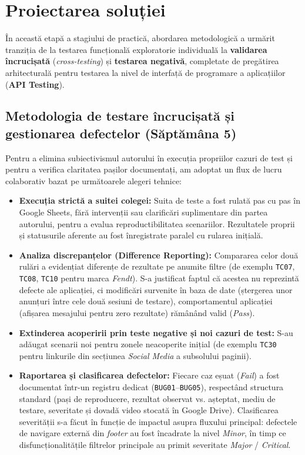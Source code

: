 \chapter{Proiectarea soluției}

În această etapă a stagiului de practică, abordarea metodologică a urmărit tranziția de la testarea funcțională exploratorie individuală la \textbf{validarea încrucișată} (\textit{cross-testing}) și \textbf{testarea negativă}, completate de pregătirea arhitecturală pentru testarea la nivel de interfață de programare a aplicațiilor (\textbf{API Testing}).

\section{Metodologia de testare încrucișată și gestionarea defectelor (Săptămâna 5)}

Pentru a elimina subiectivismul autorului în execuția propriilor cazuri de test și pentru a verifica claritatea pașilor documentați, am adoptat un flux de lucru colaborativ bazat pe următoarele alegeri tehnice:

\begin{itemize}
    \item \textbf{Execuția strictă a suitei colegei:} Suita de teste a fost rulată pas cu pas în Google Sheets, fără intervenții sau clarificări suplimentare din partea autorului, pentru a evalua reproductibilitatea scenariilor. Rezultatele proprii și statusurile aferente au fost înregistrate paralel cu rularea inițială.
    \item \textbf{Analiza discrepanțelor (Difference Reporting):} Compararea celor două rulări a evidențiat diferențe de rezultate pe anumite filtre (de exemplu \texttt{TC07}, \texttt{TC08}, \texttt{TC10} pentru marca \textit{Fendt}). S-a justificat faptul că acestea nu reprezintă defecte ale aplicației, ci modificări survenite în baza de date (ștergerea unor anunțuri între cele două sesiuni de testare), comportamentul aplicației (afișarea mesajului pentru zero rezultate) rămânând valid (\textit{Pass}).
    \item \textbf{Extinderea acoperirii prin teste negative și noi cazuri de test:} S-au adăugat scenarii noi pentru zonele neacoperite inițial (de exemplu \texttt{TC30} pentru linkurile din secțiunea \textit{Social Media} a subsolului paginii).
    \item \textbf{Raportarea și clasificarea defectelor:} Fiecare caz eșuat (\textit{Fail}) a fost documentat într-un registru dedicat (\texttt{BUG01}--\texttt{BUG05}), respectând structura standard (pași de reproducere, rezultat observat vs. așteptat, mediu de testare, severitate și dovadă video stocată în Google Drive). Clasificarea severității s-a făcut în funcție de impactul asupra fluxului principal: defectele de navigare externă din \textit{footer} au fost încadrate la nivel \textit{Minor}, în timp ce disfuncționalitățile filtrelor principale au primit severitate \textit{Major} / \textit{Critical}.
\end{itemize}

